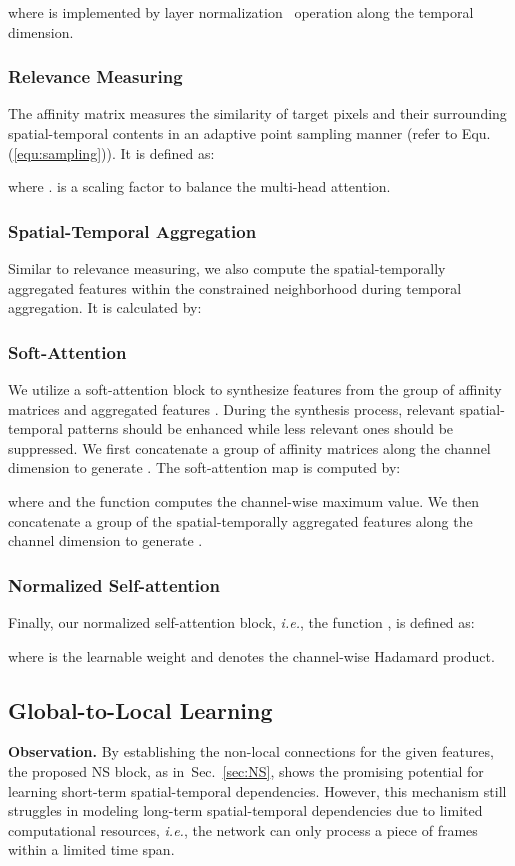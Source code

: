 \documentclass[default,iicol]{sn-jnl}
\theoremstyle{thmstyleone}
\theoremstyle{thmstyletwo}
\theoremstyle{thmstylethree}
\newcommand{\secref}[1]{Sec.~\ref{#1}}
\newcommand{\eqnref}[1]{Equ.(\ref{#1})}
\def\ie{\emph{i.e.}}
\begin{document}
where  is implemented by layer normalization~\cite{ba2016layer} operation along the temporal dimension.

\subsubsection{Relevance Measuring}\label{sec:rel_measuring}
The affinity matrix  measures the similarity of target pixels and their surrounding spatial-temporal contents in an adaptive point sampling manner (refer to \eqnref{equ:sampling}).
It is defined as:

where .
 is a scaling factor to balance the multi-head attention.

\subsubsection{Spatial-Temporal Aggregation}
Similar to relevance measuring, we also compute the spatial-temporally aggregated features  within the constrained neighborhood during temporal aggregation.
It is calculated by:


\subsubsection{Soft-Attention}
We utilize a soft-attention block to synthesize features from the group of affinity matrices  and aggregated features .
During the synthesis process, relevant spatial-temporal patterns should be enhanced 
while less relevant ones should be suppressed.
We first concatenate a group of affinity matrices  along the channel dimension to generate .
The soft-attention map  is computed by:

where  and the  function computes the channel-wise maximum value.
We then concatenate a group of the spatial-temporally aggregated features  along the channel dimension to generate .

\subsubsection{Normalized Self-attention}
Finally, our normalized self-attention block, \ie, the function , is defined as:

where  is the learnable weight and  denotes the channel-wise Hadamard product.

\subsection{Global-to-Local Learning}\label{sec:glns_pipeline}
\noindent\textbf{Observation.} 
By establishing the non-local connections for the given features, the proposed NS block, as in~\secref{sec:NS}, shows the promising potential for learning short-term spatial-temporal dependencies.
However, this mechanism still struggles in modeling long-term spatial-temporal dependencies due to limited computational resources, \ie, the network can only process a piece of frames within a limited time span.
\end{document}

